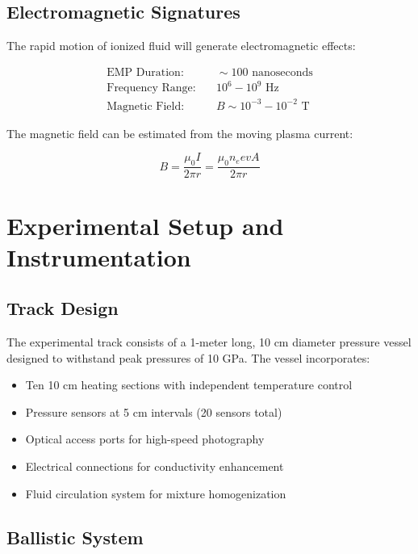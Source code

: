 \documentclass[12pt,a4paper]{article}
\begin{document}
\subsection{Electromagnetic Signatures}

The rapid motion of ionized fluid will generate electromagnetic effects:

\begin{align}
\text{EMP Duration:} &\quad \sim 100 \text{ nanoseconds} \\
\text{Frequency Range:} &\quad 10^{6}-10^{9} \text{ Hz} \\
\text{Magnetic Field:} &\quad B \sim 10^{-3}-10^{-2} \text{ T}
\end{align}

The magnetic field can be estimated from the moving plasma current:

\begin{equation}
B = \frac{\mu_0 I}{2\pi r} = \frac{\mu_0 n_e e v A}{2\pi r}
\label{eq:magnetic_field}
\end{equation}

\section{Experimental Setup and Instrumentation}

\subsection{Track Design}

The experimental track consists of a 1-meter long, 10 cm diameter pressure vessel designed to withstand peak pressures of 10 GPa. The vessel incorporates:

\begin{itemize}
\item Ten 10 cm heating sections with independent temperature control
\item Pressure sensors at 5 cm intervals (20 sensors total)
\item Optical access ports for high-speed photography
\item Electrical connections for conductivity enhancement
\item Fluid circulation system for mixture homogenization
\end{itemize}

\subsection{Ballistic System}
\end{document}
